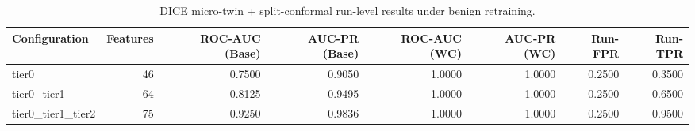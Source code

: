 \begin{table}[t]
\centering
\caption{DICE micro-twin + split-conformal run-level results under benign retraining.}
\label{tab:dice_full_overall}
\footnotesize
\begin{tabular}{lrrrrrrr}
\toprule
Configuration & Features & ROC-AUC (Base) & AUC-PR (Base) & ROC-AUC (WC) & AUC-PR (WC) & Run-FPR & Run-TPR \\
\midrule
tier0 & 46 & 0.7500 & 0.9050 & 1.0000 & 1.0000 & 0.2500 & 0.3500 \\
tier0_tier1 & 64 & 0.8125 & 0.9495 & 1.0000 & 1.0000 & 0.2500 & 0.6500 \\
tier0_tier1_tier2 & 75 & 0.9250 & 0.9836 & 1.0000 & 1.0000 & 0.2500 & 0.9500 \\
\bottomrule
\end{tabular}

\end{table}
